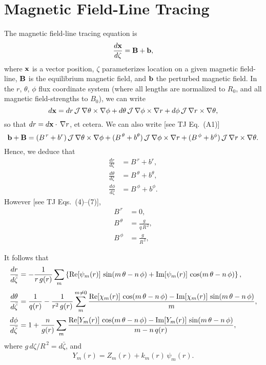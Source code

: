 \documentclass[12pt,prb,aps,notitlepage]{revtex4-1}
\begin{document}
\section{Magnetic Field-Line Tracing}
The magnetic field-line tracing equation is
\begin{equation}
\frac{d{\bf x}}{d\zeta} = {\bf B} +{\bf b},
\end{equation}
where ${\bf x}$ is a vector position, $\zeta$ parameterizes location on a given magnetic field-line, ${\bf B}$ is the equilibrium magnetic
field, and ${\bf b}$ the perturbed magnetic field. 
In the $r$, $\theta$, $\phi$ flux coordinate system (where all lengths are normalized to $R_0$, and all magnetic field-strengths to $B_0$), we can write
\begin{equation}
d{\bf x} = dr\,{\cal J}\,\nabla\theta\times \nabla\phi + d\theta\,{\cal J}\,\nabla\phi\times\nabla r + d\phi\,{\cal J}\,\nabla r\times\nabla \theta,
\end{equation}
so that $dr = d{\bf x}\cdot\,\nabla r$, et cetera. We can also write [see TJ Eq.~(A1)] 
\begin{equation}
{\bf b} +{\bf B} = (B^{\,r}+b^r)\,{\cal J}\,\nabla\theta\times \nabla\phi + (B^{\,\theta}+b^\theta)\,{\cal J}\,\nabla\phi\times\nabla r + (B^{\,\phi}+b^\phi)\,{\cal J}\,\nabla r\times\nabla \theta.
\end{equation}
Hence, we deduce that
\begin{align}
\frac{dr}{d\zeta} & = B^{\,r} + b^r,\\[0.5ex]
\frac{d\theta}{d\zeta}&= B^{\,\theta}+ b^\theta,\\[0.5ex]
\frac{d\phi}{d\zeta} &= B^{\,\phi}+ b^\phi.
\end{align}
However [see TJ Eqs.~(4)--(7)], 
\begin{align}
B^{\,r} &=0,\\[0.5ex]
B^{\,\theta}&= \frac{g}{q\,R^{\,2}},\\[0.5ex]
B^{\,\phi}&= \frac{g}{R^{\,2}},
\end{align}

It follows that 
\begin{align}
\frac{dr}{d\bar{\zeta}}&= -\frac{1}{r\,g(r)}\sum_m\left\{{\rm Re}[\psi_m(r)]\,\sin(m\,\theta-n\,\phi) + {\rm Im}[\psi_m(r)]\,\cos(m\,\theta-n\,\phi)\right\},\\[0.5ex]
\frac{d\theta}{d\bar{\zeta}}&= \frac{1}{q(r)} -\frac{1}{r^2\,g(r)}\sum_m^{m\neq 0} \frac{{\rm Re}[\chi_m(r)]\,\cos(m\,\theta-n\,\phi) - {\rm Im}[\chi_m(r)]\,\sin(m\,\theta-n\,\phi)}{m}, \\[0.5ex]
\frac{d\phi}{d\bar{\zeta}}&= 1 + \frac{n}{g(r)}\sum_m\frac{{\rm Re}[Y_m(r)]\,\cos(m\,\theta-n\,\phi) - {\rm Im}[Y_m(r)]\,\sin(m\,\theta-n\,\phi)}{m-n\,q(r)},
\end{align}
where $g\,d\zeta/R^{\,2}= d\bar{\zeta}$, and
\begin{align}
Y_m(r)= Z_m(r) + k_m(r)\,\psi_m(r).
\end{align}
\end{document}
